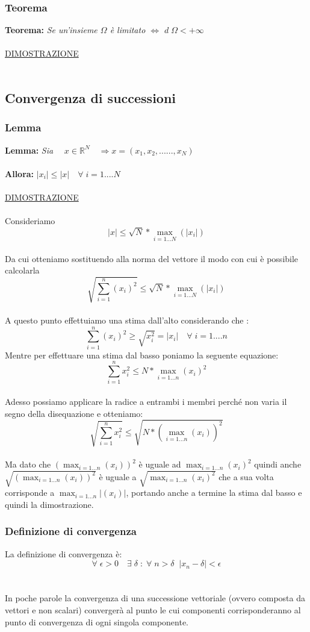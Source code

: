 \documentclass[fontsize = 20px, paper = a4]{article}
\begin{document}
\subsubsection{Teorema}
\textbf{Teorema: }\emph{Se un'insieme $\Omega$ è limitato $\Longleftrightarrow$ $d \; \Omega < +\infty$ }\\ \\ \underline{DIMOSTRAZIONE} \\ \\ 

\subsection{Convergenza di successioni}
\subsubsection{Lemma}
\textbf{Lemma: } \emph{Sia} $\quad x \in \mathbb{R}^N \quad \Longrightarrow x = (x_1,x_2,......,x_N)$ \\\\ 
\textbf{Allora: } \hspace{0.2cm}$|x_i| \le |x| \quad \forall \; i = 1....N $ \\ \\
\underline{DIMOSTRAZIONE} \\ \\
Consideriamo
$$|x| \le \sqrt{N} * \max_{i = 1...N}(|x_i|)$$ \\
Da cui otteniamo sostituendo alla norma del vettore il modo con cui è possibile calcolarla
$$\sqrt{\sum_{i = 1}^n (x_i)^2} \le \sqrt{N} * \max_{i = 1...N}(|x_i|)$$ \\
A questo punto effettuiamo una stima dall'alto considerando che :
$$\sum_{i = 1} ^ n (x_i)^2 \ge \sqrt{x_i ^2}= |x_i| \quad \forall \; i = 1....n$$
Mentre per effettuare una stima dal basso poniamo la seguente equazione:
$$\sum_{i = 1}^n x_i ^2 \le N * \max_{i = 1...n}(x_i)^2$$ \\
Adesso possiamo applicare la radice a entrambi i membri perché non varia il segno della disequazione  e otteniamo:
$$\sqrt{\sum_{i = 1}^n x_i ^2} \le \sqrt{ N * (\max_{i = 1...n}(x_i)) ^ 2}$$ \\
Ma dato che $(\max_{i = 1...n}(x_i))^2$ è uguale ad $\max_{i = 1...n}(x_i)^2$ quindi anche $\sqrt{(\max_{i = 1...n}(x_i))^2}$ è uguale a $\sqrt{\max_{i = 1...n}(x_i)^2}$ che a sua volta corrisponde a $\max_{i = 1...n}|(x_i)|$, portando anche a termine la stima dal basso e quindi la dimostrazione.
\subsubsection{Definizione di convergenza}
La definizione di convergenza è: 
$$\forall \; \epsilon > 0 \quad \exists \; \delta \; : \; \forall \; n > \delta \; \; |x_n - \delta| < \epsilon$$ \\ \\
In poche parole la convergenza di una successione vettoriale (ovvero composta da vettori e non scalari) convergerà al punto le cui componenti corrisponderanno al punto di convergenza  di ogni singola componente.
\end{document}
